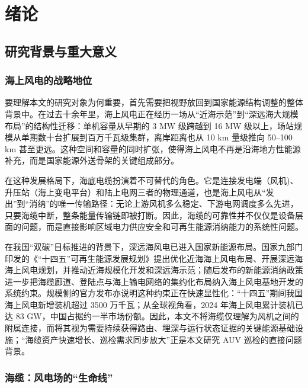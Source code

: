 
\chapter{绪论}

\section{研究背景与重大意义}\label{sec:ch01-1-1}

\subsection{海上风电的战略地位}\label{sec:ch01-1-1-1}

要理解本文的研究对象为何重要，首先需要把视野放回到国家能源结构调整的整体背景中。在过去十余年里，海上风电正在经历一场从``近海示范''到``深远海大规模布局''的结构性迁移：单机容量从早期的 3 MW 级跨越到 16 MW 级以上，场站规模从单期数十台扩展到百万千瓦级集群，离岸距离也从 10 km 量级推向 50--100 km 甚至更远。这种空间和容量的同时扩张，使得海上风电不再是沿海地方性能源补充，而是国家能源外送骨架的关键组成部分。

在这种发展格局下，海底电缆扮演着不可替代的角色。它是连接发电端（风机)、升压站（海上变电平台）和陆上电网三者的物理通道，也是海上风电从``发出''到``消纳''的唯一传输路径：无论上游风机多么稳定、下游电网调度多么先进，只要海缆中断，整条能量传输链即被打断。因此，海缆的可靠性并不仅仅是设备层面的问题，而是直接影响区域电力供应安全和可再生能源消纳能力的系统性问题。

在我国``双碳''目标推进的背景下，深远海风电已进入国家新能源布局。国家九部门印发的《``十四五''可再生能源发展规划》提出优化近海海上风电布局、开展深远海海上风电规划，并推动近海规模化开发和深远海示范；随后发布的新能源消纳政策进一步把海缆廊道、登陆点与海上输电网络的集约化布局纳入海上风电基地开发的系统约束\cite{ndrc2022renewableplan}。规模侧的官方发布亦说明这种约束正在快速显性化：``十四五''期间我国海上风电新增装机超过 3500 万千瓦\cite{scio2025energyachievement}；从全球视角看，2024 年海上风电累计装机已达 83 GW，中国占据约一半市场份额\cite{gwec2025offshore}。因此，本文不将海缆仅理解为风机之间的附属连接，而将其视为需要持续获得路由、埋深与运行状态证据的关键能源基础设施；``海缆资产快速增长、巡检需求同步放大''正是本文研究 AUV 巡检的直接问题背景。

\subsection{海缆：风电场的``生命线''}\label{sec:ch01-1-1-2}

